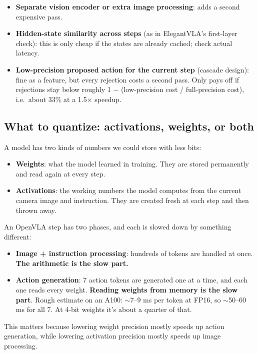 \documentclass[11pt]{article}
\begin{document}
\begin{itemize}
\item \textbf{Separate vision encoder or extra image processing}: adds a second expensive pass.
\item \textbf{Hidden-state similarity across steps} (as in ElegantVLA's first-layer check): this is only cheap if the states are already cached; check actual latency.
\item \textbf{Low-precision proposed action for the current step} (cascade design): fine as a feature, but every rejection costs a second pass. Only pays off if rejections stay below roughly 1 $-$ (low-precision cost / full-precision cost), i.e.~about 33\% at a 1.5$\times$ speedup.
\end{itemize}

\subsection{What to quantize: activations, weights, or both}\label{what-to-quantize-activations-weights-or-both}

A model has two kinds of numbers we could store with less bits:

\begin{itemize}
\item \textbf{Weights}: what the model learned in training. They are stored permanently and read again at every step.
\item \textbf{Activations}: the working numbers the model computes from the current camera image and instruction. They are created fresh at each step and then thrown away.
\end{itemize}

An OpenVLA step has two phases, and each is slowed down by something different:

\begin{itemize}
\item \textbf{Image + instruction processing}: hundreds of tokens are handled at once. \textbf{The arithmetic is the slow part.}
\item \textbf{Action generation}: 7 action tokens are generated one at a time, and each one reads every weight. \textbf{Reading weights from memory is the slow part}. Rough estimate on an A100: $\sim$7--9 ms per token at FP16, so $\sim$50--60 ms for all 7. At 4-bit weights it's about a quarter of that.
\end{itemize}

This matters because lowering weight precision mostly speeds up action generation, while lowering activation precision mostly speeds up image processing.
\end{document}
